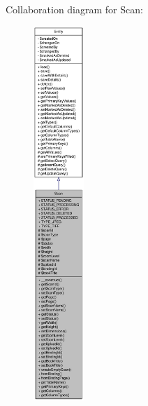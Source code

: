 Collaboration diagram for Scan:\nopagebreak
\begin{figure}[H]
\begin{center}
\leavevmode
\includegraphics[height=400pt]{classScan__coll__graph}
\end{center}
\end{figure}
